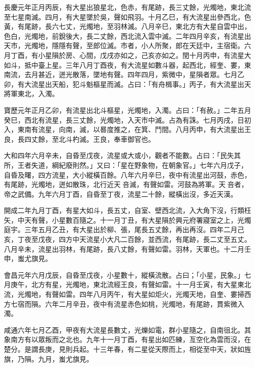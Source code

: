 \begin{pinyinscope}
 長慶元年正月丙辰，有大星出狼星北，色赤，有尾跡，長三丈餘，光燭地，東北流至七星南滅。四月，有大星墜於吳，聲如飛羽。十月乙巳，有大流星出參西北，色黃，有尾跡，長六七丈，光燭地，至羽林滅。八月辛巳，東北方有大星自雲中出，色白，光燭地，前銳後大，長二丈餘，西北流入雲中滅。二年四月辛亥，有流星出天市，光燭地，隱隱有聲，至郎位滅。市者，小人所聚，郎在天廷中，主宿衛。六月丁酉，有小星隕於房、心間，戊戌亦如之，己亥亦如之。閏十月丙申，有流星大如斗，抵中臺上星。三年八月丁酉夜，有大流星如數斗器，起西北，經奎、婁，東南流，去月甚近，迸光散落，墜地有聲。四年四月，紫微中，星隕者眾。七月乙卯，有大流星出天船，犯斗魁樞星而滅。占曰：「有舟楫事。」丙子，有大流星出天將軍東北，入濁。



 寶歷元年正月乙卯，有流星出北斗樞星，光燭地，入濁。占曰：「有赦。」二年五月癸巳，西北有流星，長三丈餘，光燭地，入天市中滅。占為有誅。七月丙戌，日初入，東南有流星，向南，滅，以晷度推之，在箕、鬥間。八月丙申，有大流星出王良，長四丈餘，至北斗杓滅。王良，奉車御官也。



 大和四年六月辛未，自昏至戊夜，流星或大或小，觀者不能數。占曰：「民失其所，王者失道，綱紀廢則然。」又曰：「星在野象物，在朝象官。」七年六月戊子，自昏及曙，四方流星，大小縱橫百餘。八年六月辛巳，夜中有流星出河鼓，赤色，有尾跡，光燭地，迸如散珠，北行近天咅滅，有聲如雷。河鼓為將軍。天咅者，帝之武備。九年六月丁酉，自昏至丁夜，流星二十餘，縱橫出沒，多近天漢。



 開成二年九月丁酉，有星大如斗，長五丈，自室、壁西北流，入大角下沒，行類枉矢，中天有聲，小星數百隨之。十一月丁丑，有大星隕於興元府署寢室之上，光燭庭宇。三年五月乙丑，有大星出於柳、張，尾長五丈餘，再出再沒。四年二月己亥，丁夜至戊夜，四方中天流星小大凡二百餘，並西流，有尾跡，長二丈至五丈。八月辛未，流星出羽林，有尾跡，長八丈餘，有聲如雷。羽林，天軍也。十二月壬申，蚩尤旗見。



 會昌元年六月戊辰，自昏至戊夜，小星數十，縱橫流散。占曰；「小星，民象。」七月庚午，北方有星，光燭地，東北流經王良，有聲如雷。十一月壬寅，有大星東北流，光燭地，有聲如雷。四年八月丙午，有大星如炬火，光燭天地，自奎、婁掃西方七宿而隕。六年二月辛丑，夜中有流星赤色如桃，光燭地，有尾跡，貫紫微入濁。



 咸通六年七月乙酉，甲夜有大流星長數丈，光爍如電，群小星隨之，自南徂北。其象南方有以眾叛而之北也。九年十一月丁酉，有星出如匹練，亙空化為雲而沒，在楚分。是謂長庚，見則兵起。十三年春，有二星從天際而上，相從至中天，狀如旌旗，乃隕。九月，蚩尤旗見。




\end{pinyinscope}

